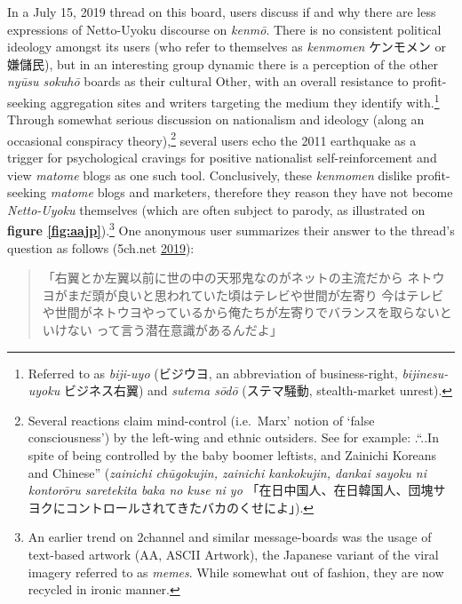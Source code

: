 \documentclass[10pt,british,A4paper,,openany]{memoir}
\begin{document}
In a July 15, 2019 thread on this board, users discuss if and why there
are less expressions of Netto-Uyoku discourse on \emph{kenmō}. There is
no consistent political ideology amongst its users (who refer to
themselves as \emph{kenmomen} ケンモメン or 嫌儲民), but in an
interesting group dynamic there is a perception of the other \emph{nyūsu
sokuhō} boards as their cultural Other, with an overall resistance to
profit-seeking aggregation sites and writers targeting the medium they
identify with.\footnote{Referred to as \emph{biji-uyo} (ビジウヨ, an
  abbreviation of business-right, \emph{bijinesu-uyoku} ビジネス右翼)
  and \emph{sutema sōdō} (ステマ騒動, stealth-market unrest).} Through
somewhat serious discussion on nationalism and ideology (along an
occasional conspiracy theory),\footnote{Several reactions claim
  mind-control (i.e.~Marx' notion of `false consciousness') by the
  left-wing and ethnic outsiders. See for example: .``..In spite of
  being controlled by the baby boomer leftists, and Zainichi Koreans and
  Chinese'' (\emph{zainichi chūgokujin, zainichi kankokujin, dankai
  sayoku ni kontorōru saretekita baka no kuse ni yo}
  「在日中国人、在日韓国人、団塊サヨクにコントロールされてきたバカのくせによ」).}
several users echo the 2011 earthquake as a trigger for psychological
cravings for positive nationalist self-reinforcement and view
\emph{matome} blogs as one such tool. Conclusively, these
\emph{kenmomen} dislike profit-seeking \emph{matome} blogs and
marketers, therefore they reason they have not become \emph{Netto-Uyoku}
themselves (which are often subject to parody, as illustrated on
\textbf{figure \ref{fig:aajp}}).\footnote{An earlier trend on 2channel
  and similar message-boards was the usage of text-based artwork (AA,
  ASCII Artwork), the Japanese variant of the viral imagery referred to
  as \emph{memes}. While somewhat out of fashion, they are now recycled
  in ironic manner.} One anonymous user summarizes their answer to the
thread's question as follows (5ch.net
\protect\hyperlink{ref-5ch.net_eng._2019}{2019}):

\begin{quote}
「右翼とか左翼以前に世の中の天邪鬼なのがネットの主流だから\newline
ネトウヨがまだ頭が良いと思われていた頃はテレビや世間が左寄り\newline
今はテレビや世間がネトウヨやっているから俺たちが左寄りでバランスを取らないといけない\newline
って言う潜在意識があるんだよ」
\end{quote}
\end{document}
